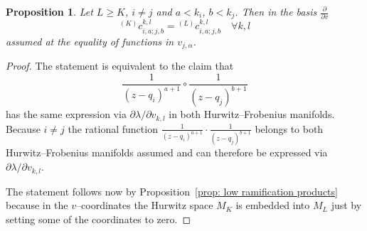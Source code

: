 \documentclass[10pt,a4paper]{amsart}
\newtheorem{proposition}{Proposition}
\newcommand{\p}{{\partial}}
\begin{document}
\begin{proposition}\label{prop: v-product stabilization}
    Let $L \ge K$, $i \neq j$ and $a < k_i$, $b < k_j$. Then in the basis $ \frac{\p}{\p v}$
    \[
        {}^{(K)}c_{i,a;j,b}^{k,l} = {}^{(L)}c_{i,a;j,b}^{k,l} \quad \forall k,l
    \]
    assumed at the equality of functions in $v_{j,\alpha}$.
\end{proposition}

\begin{proof}
    The statement is equivalent to the claim that
    \[
        \frac{1}{(z - q_i)^{a+1}} \circ \frac{1}{(z - q_j)^{b+1}}
    \]
    has the same expression via $\p \lambda / \p v_{k,l}$ in both Hurwitz--Frobenius manifolds. Because $i \neq j$ the rational function $\frac{1}{(z - q_i)^{a+1}} \cdot \frac{1}{(z - q_j)^{b+1}}$ belongs to both Hurwitz--Frobenius manifolds assumed and can therefore be expressed via $\p \lambda / \p v_{k,l}$.    
    
    The statement follows now by Proposition~\ref{prop: low ramification products} because in the $v$--coordinates the Hurwitz space $M_K$ is embedded into $M_L$ just by setting some of the coordinates to zero.
\end{proof}
\end{document}
